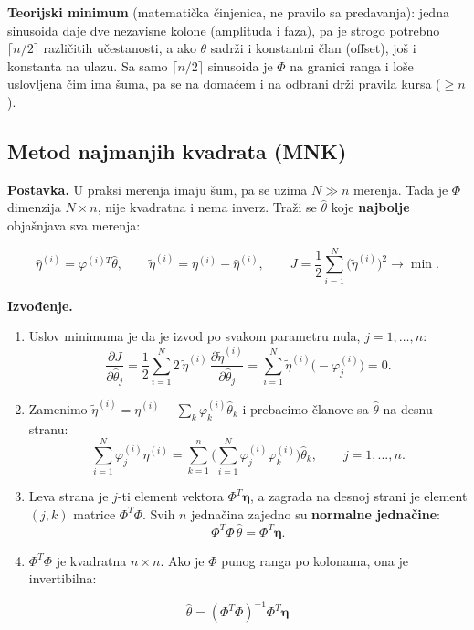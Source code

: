 \documentclass[11pt,a4paper,parskip=half,headsepline,numbers=noenddot]{scrartcl}
\begin{document}
\textbf{Teorijski minimum} (matematička činjenica, ne pravilo sa predavanja): jedna sinusoida daje dve nezavisne kolone (amplituda i faza), pa je strogo potrebno \(\lceil n/2\rceil\) različitih učestanosti, a ako \(\theta\) sadrži i konstantni član (offset), još i konstanta na ulazu. Sa samo \(\lceil n/2\rceil\) sinusoida je \(\Phi\) na granici ranga i loše uslovljena čim ima šuma, pa se na domaćem i na odbrani drži pravila kursa (\(\ge n\)).

\subsection{Metod najmanjih kvadrata (MNK)}

\textbf{Postavka.} U praksi merenja imaju šum, pa se uzima \(N \gg n\) merenja. Tada je \(\Phi\) dimenzija \(N\times n\), nije kvadratna i nema inverz. Traži se \(\hat\theta\) koje \textbf{najbolje} objašnjava sva merenja:

\[\hat\eta^{(i)} = \varphi^{(i)T}\hat\theta,\qquad \tilde\eta^{(i)} = \eta^{(i)} - \hat\eta^{(i)},\qquad J = \frac12\sum_{i=1}^{N}\big(\tilde\eta^{(i)}\big)^2 \to \min .\]

\textbf{Izvođenje.}

\begin{enumerate}
\def\labelenumi{\arabic{enumi}.}
\item Uslov minimuma je da je izvod po svakom parametru nula, \(j = 1,\dots,n\):
  \[\frac{\partial J}{\partial\hat\theta_j} = \frac12\sum_{i=1}^N 2\,\tilde\eta^{(i)}\,\frac{\partial\tilde\eta^{(i)}}{\partial\hat\theta_j} = \sum_{i=1}^N \tilde\eta^{(i)}\big(-\varphi_j^{(i)}\big) = 0 .\]
\item Zamenimo \(\tilde\eta^{(i)} = \eta^{(i)} - \sum_k\varphi_k^{(i)}\hat\theta_k\) i prebacimo članove sa \(\hat\theta\) na desnu stranu:
  \[\sum_{i=1}^N\varphi_j^{(i)}\eta^{(i)} = \sum_{k=1}^n\Big(\sum_{i=1}^N\varphi_j^{(i)}\varphi_k^{(i)}\Big)\hat\theta_k,\qquad j = 1,\dots,n .\]
\item Leva strana je \(j\)-ti element vektora \(\Phi^T\boldsymbol\eta\), a zagrada na desnoj strani je element \((j,k)\) matrice \(\Phi^T\Phi\). Svih \(n\) jednačina zajedno su \textbf{normalne jednačine}:
  \[\Phi^T\Phi\,\hat\theta = \Phi^T\boldsymbol\eta .\]
\item \(\Phi^T\Phi\) je kvadratna \(n\times n\). Ako je \(\Phi\) punog ranga po kolonama, ona je invertibilna:
\end{enumerate}

\[\hat\theta = (\Phi^T\Phi)^{-1}\Phi^T\boldsymbol\eta\]
\end{document}
